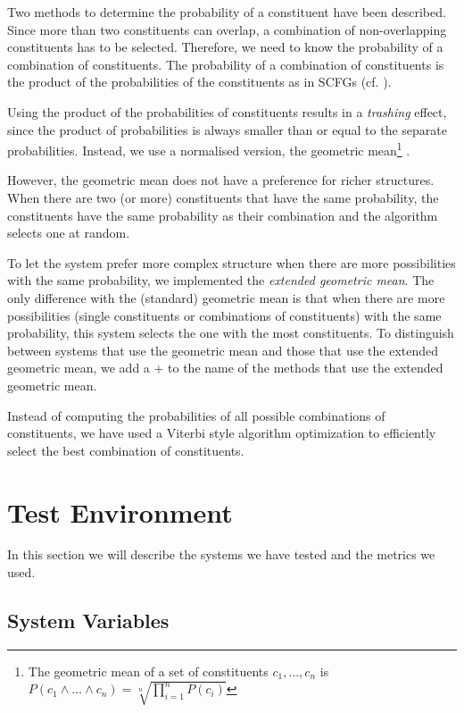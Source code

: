 \documentclass[letterpaper,mlapa]{article}
\begin{document}
Two methods to determine the probability of a constituent have been described.
Since more than two constituents can overlap, a combination of non-overlapping
constituents has to be selected. Therefore, we need to know the probability of
a combination of constituents. The probability of a combination of
constituents is the product of the probabilities of the constituents as in
SCFGs (cf. ).

Using the product of the probabilities of constituents results in a
\emph{trashing} effect, since the product of probabilities is always smaller
than or equal to the separate probabilities. Instead, we use a normalised
version, the geometric mean\footnote{The geometric mean of a set of
constituents $c_1, \ldots, c_n$ is \(P(c_1\wedge\ldots\wedge
c_n)=\sqrt[n]{\prod_{i=1}^n P(c_i)}\)} \cite{bib:nfomfbfpcp}.

However, the geometric mean does not have a preference for richer structures.
When there are two (or more) constituents that have the same probability, the
constituents have the same probability as their combination and the algorithm
selects one at random.

To let the system prefer more complex structure when there are more
possibilities with the same probability, we implemented the \emph{extended
geometric mean}. The only difference with the (standard) geometric mean is that
when there are more possibilities (single constituents or combinations of
constituents) with the same probability, this system selects the one with the
most constituents. To distinguish between systems that use the geometric mean
and those that use the extended geometric mean, we add a + to the name of the
methods that use the extended geometric mean.

Instead of computing the probabilities of all possible combinations of
constituents, we have used a Viterbi  style algorithm
optimization to efficiently select the best combination of constituents.


\section{Test Environment}

In this section we will describe the systems we have tested and the metrics we
used.

\subsection{System Variables}
\end{document}
